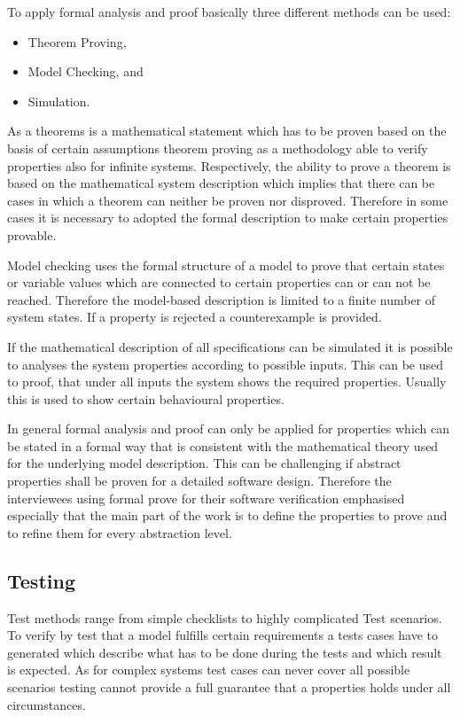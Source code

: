 \documentclass{./template/openetcs_report}
\begin{document}
To apply formal analysis and proof basically three different methods can be used: 

\vspace{-10pt}
\begin{itemize}[topsep=2pt, partopsep=2pt,itemsep=2pt,parsep=2pt]
\item Theorem Proving,	
\item Model Checking, and
\item Simulation.	
\end{itemize}

As a theorems is a mathematical statement which has to be proven based on the basis of certain assumptions theorem proving as a methodology able to verify properties also for infinite systems. Respectively, the ability to prove a theorem is based on the mathematical system description which implies that there can be cases in which a theorem can neither be proven nor disproved. Therefore in some cases it is necessary to adopted the formal description to make certain properties provable.

Model checking uses the formal structure of a model to prove that certain states or variable values which are connected to certain properties can or can not be reached. Therefore the model-based description is limited to a finite number of system states. If a property is rejected a counterexample is provided.

If the mathematical description of all specifications can be simulated it is possible to analyses the system properties according to possible inputs. This can be used to proof, that under all inputs the system shows the required properties. Usually this is used to show certain behavioural properties.

In general  formal analysis and proof can only be applied for properties which can be stated in a formal way that is consistent with the mathematical theory used for the underlying model description. This can be challenging if abstract properties shall be proven for a detailed software design. Therefore the interviewees using formal prove for their software verification emphasised especially that the main part of the work is to define the properties to prove and to refine them for every abstraction level.

\subsection{Testing}

Test methods range from simple checklists to highly complicated Test scenarios. To verify by test that a model fulfills certain requirements a tests cases have to generated which describe what has to be done during the tests and which result is expected. As for complex systems test cases can never cover all possible scenarios testing cannot provide a full guarantee that a properties holds under all circumstances.
\end{document}
